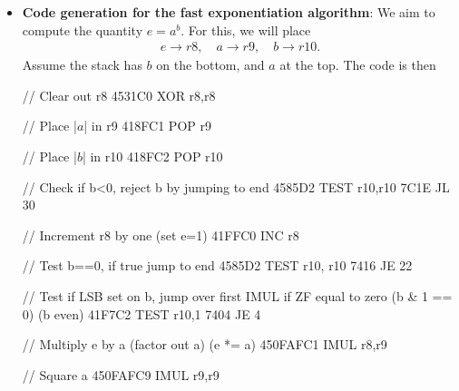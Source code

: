 \documentclass{report}
\begin{document}
\begin{itemize}
\begin{cppcode}
{                    if (b <= 0) {
                        cerr << "Negative b rejected'\n";
                        _exit(1);
                    }

                    int e{1};
                    while (b != 0) {
                        // Check if the LSB is set, then b is odd, so factor out a
                        if (b & 1) {
                            e *= a;
                        }

                        // Square a
                        a *= a;

                        // Divide b by two
                        b>>=1; // floors b/2, no need to subtract one from b to make it even
                    }  
                    return e;
                }
            \end{cppcode}
        \item \textbf{Code generation for the fast exponentiation algorithm}: We aim to compute the quantity $e = a^{b}$. For this, we will place 
            \begin{align*}
                e \to r8, \quad a \to r9, \quad b \to r10
            .\end{align*}
            Assume the stack has $b$ on the bottom, and $a$ at the top. The code is then
            \begin{cppcode}
                // Clear out r8
                4531C0   XOR   r8,r8                 

                // Place |$a$| in r9
                418FC1   POP   r9

                // Place |$b$| in r10
                418FC2   POP   r10

                // Check if b<0, reject b by jumping to end
                4585D2   TEST  r10,r10
                7C1E     JL    30

                // Increment r8 by one (set e=1)
                41FFC0   INC   r8

                // Test b==0, if true jump to end
                4585D2   TEST  r10, r10
                7416     JE    22

                // Test if LSB set on b, jump over first IMUL if ZF equal to zero (b & 1 == 0) (b even)
                41F7C2   TEST  r10,1
                7404     JE    4

                // Multiply e by a (factor out a) (e *= a)
                450FAFC1 IMUL  r8,r9

                // Square a 
                450FAFC9 IMUL  r9,r9


\end{cppcode}
\end{itemize}
\end{document}
